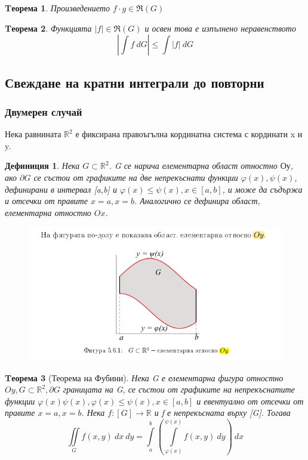 \documentclass[a4paper,fleqn,12pt]{article}
\newtheorem{theorem}{Tеорема}[subsection]
\newtheorem{definition}{Дефиниция}[subsection]
\theoremstyle{definition}
\begin{document}
\begin{theorem}
Произведението $f \cdot g \in \Re(G)$
\end{theorem}

\begin{theorem}
Функцията $\vert f \vert \in \Re(G)$ и освен това е изпълнено неравенството 
$$\left \vert \int f \ dG \right \vert \leq \int \vert f \vert \ dG$$
\end{theorem}

\newpage
\subsection{Свеждане на кратни интеграли до повторни}

\subsubsection{Двумерен случай}
Нека равнината $\mathbb{R}^2$ е фиксирана правоъгълна кординатна система с кординати x и y.

\begin{definition}
Нека $G \subset \mathbb{R}^2$. G се нарича елементарна област отностно $Оу$, ако $\partial G$ се състои от графиките на две непрекъснати функции $\varphi(x), \psi(x)$, дефинирани в интервал [a,b] и $\varphi(x) \leq \psi(x), x\in [a,b]$, и може да съдържа и отсечки от правите $x = a, x = b$. Аналогично се дефинира област, елементарна отностно $Ox$.
\begin{figure}[htp!]
  \includegraphics{Pics/calc/lec9-1.png}
\end{figure}

\end{definition}

\begin{theorem}[Теорема на Фубини]
Нека G е елементарна фигура отностно $Oy, G \subset \mathbb{R}^2, \partial G$ границата на G, се състои от графиките на непрекъснатите функции $\varphi(x) \psi(x), \varphi(x) \leq \psi(x), x\in [a,b]$ и евентуално от отсечки от правите $x = a, x = b$. Нека $f: [G] \to \mathbb{R}$ и f е непрекъсната върху [G]. Тогава
$$\iint\limits_{G} f(x,y) \ dx \ dy = \int\limits_a ^b \left( \int\limits_{\varphi(x)} ^{\psi(x)}  f(x,y) \ dy \right) \ dx$$
\end{theorem}
\end{document}
